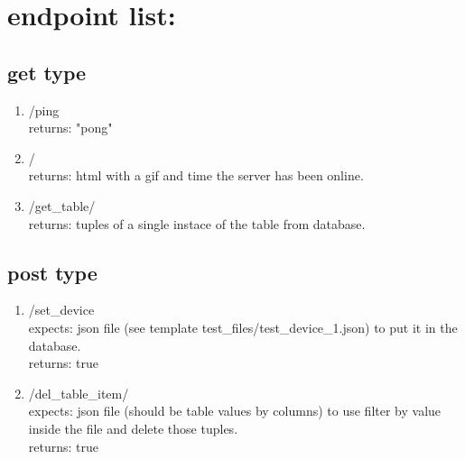 \documentclass{article}
\begin{document}
\section*{endpoint list:}
\subsection*{get type}
\begin{enumerate}
    \item /ping \\ returns: "pong"
    \item / \\ returns: html with a gif and time the server has been online.
    \item /get\_table/ \\ returns: tuples of a single instace of the table from database.
\end{enumerate}

\subsection*{post type}
\begin{enumerate}
    \item /set\_device \\ expects: json file (see template test\_files/test\_device\_1.json) to put it in the database.\\ returns: true 
    \item /del\_table\_item/ \\ expects: json file (should be table values by columns) to use filter by value inside the file and delete those tuples.\\ returns: true
\end{enumerate}
\end{document}
